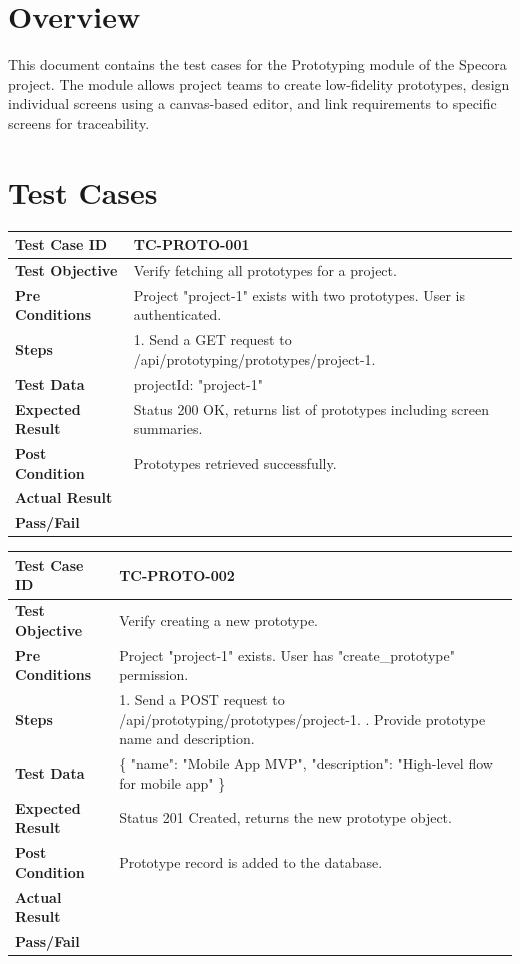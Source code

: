 \section{Overview}
This document contains the test cases for the Prototyping module of the Specora project. The module allows project teams to create low-fidelity prototypes, design individual screens using a canvas-based editor, and link requirements to specific screens for traceability.

\section{Test Cases}

\begin{longtable}{|p{}|p{}|}
\hline
\textbf{Test Case ID} & TC-PROTO-001 \\ \hline
\textbf{Test Objective} & Verify fetching all prototypes for a project. \\ \hline
\textbf{Pre Conditions} & Project "project-1" exists with two prototypes. User is authenticated. \\ \hline
\textbf{Steps} & 
1. Send a GET request to /api/prototyping/prototypes/project-1. \\ \hline
\textbf{Test Data} & projectId: "project-1" \\ \hline
\textbf{Expected Result} & Status 200 OK, returns list of prototypes including screen summaries. \\ \hline
\textbf{Post Condition} & Prototypes retrieved successfully. \\ \hline
\textbf{Actual Result} &  \\ \hline
\textbf{Pass/Fail} &  \\ \hline
\end{longtable}

\begin{longtable}{|p{}|p{}|}
\hline
\textbf{Test Case ID} & TC-PROTO-002 \\ \hline
\textbf{Test Objective} & Verify creating a new prototype. \\ \hline
\textbf{Pre Conditions} & Project "project-1" exists. User has "create_prototype" permission. \\ \hline
\textbf{Steps} & 
1. Send a POST request to /api/prototyping/prototypes/project-1. \newline
2. Provide prototype name and description. \\ \hline
\textbf{Test Data} & \{ "name": "Mobile App MVP", "description": "High-level flow for mobile app" \} \\ \hline
\textbf{Expected Result} & Status 201 Created, returns the new prototype object. \\ \hline
\textbf{Post Condition} & Prototype record is added to the database. \\ \hline
\textbf{Actual Result} &  \\ \hline
\textbf{Pass/Fail} &  \\ \hline
\end{longtable}

